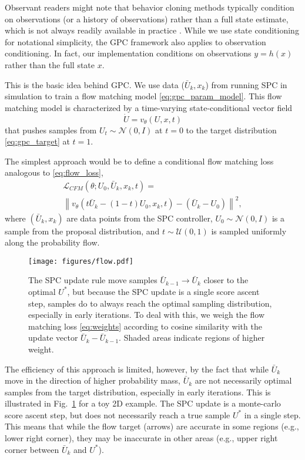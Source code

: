 \documentclass[letterpaper, 10 pt]{ieeeconf}
\begin{document}
\begin{remark}
    Observant readers might note that behavior cloning methods typically condition on observations (or a history of observations) rather than a full state estimate, which is not always readily available in practice \cite{chi2023diffusion}. While we use state conditioning for notational simplicity, the GPC framework also applies to observation conditioning. In fact, our implementation conditions on observations $y = h(x)$ rather than the full state $x$. 
\end{remark}

This is the basic idea behind GPC. We use data ($\bar{U}_k, x_k$) from running SPC in simulation to train a flow matching model \eqref{eq:gpc_param_model}. This flow matching model is characterized by a time-varying state-conditional vector field
\begin{equation}
    \dot{U} = v_\theta(U, x, t)
\end{equation}
that pushes samples from $U_t \sim \mathcal{N}(0, I)$ at $t = 0$ to the target distribution \eqref{eq:gpc_target} at $t = 1$.

The simplest approach would be to define a conditional flow matching loss analogous to \eqref{eq:flow_loss},
\begin{multline}
    \mathcal{L}_{CFM}(\theta; U_0, \bar{U}_k, x_k, t) = \\
     \left\| v_\theta(t\bar{U}_k - (1 - t)U_0, x_k, t) - (\bar{U}_k - U_0) \right\|^2,
\end{multline}
where $(\bar{U}_k, x_k)$ are data points from the SPC controller, $U_0 \sim \mathcal{N}(0, I)$ is a sample from the proposal distribution, and $t \sim \mathcal{U}(0, 1)$ is sampled uniformly along the probability flow.

\begin{figure}
    \centering
    \texttt{[image: figures/flow.pdf]}
    \caption{The SPC update rule move samples $\bar{U}_{k-1} \to \bar{U}_k$ closer to the optimal $U^*$, but because the SPC update is a single score ascent step, samples do to always reach the optimal sampling distribution, especially in early iterations. To deal with this, we weigh the flow matching loss \eqref{eq:weights} according to cosine similarity with the update vector $\bar{U}_k - \bar{U}_{k-1}$. Shaded areas indicate regions of higher weight.}
    \label{fig:flow}
\end{figure}

The efficiency of this approach is limited, however, by the fact that while $\bar{U}_k$ move in the direction of higher probability mass, $\bar{U}_k$ are not necessarily optimal samples from the target distribution, especially in early iterations. This is illustrated in Fig.~\ref{fig:flow} for a toy 2D example. The SPC update is a monte-carlo score ascent step, but does not necessarily reach a true sample $U^*$ in a single step. This means that while the flow target (arrows) are accurate in some regions (e.g., lower right corner), they may be inaccurate in other areas (e.g., upper right corner between $\bar{U}_k$ and $U^*$).
\end{document}
